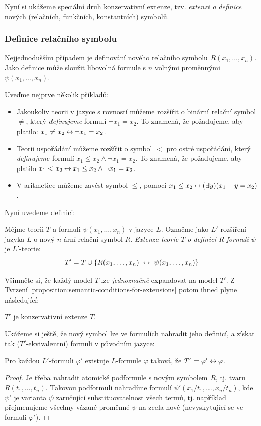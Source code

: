 Nyní si ukážeme speciální druh konzervativní extenze, tzv. \emph{extenzi o definice} nových (relačních, funkčních, konstantních) symbolů.


\subsubsection*{Definice relačního symbolu}

Nejjednodušším případem je definování nového relačního symbolu $R(x_1,\dots,x_n)$. Jako definice může sloužit libovolná formule s $n$ volnými proměnnými $\psi(x_1,\dots,x_n)$.

\begin{example}
Uveďme nejprve několik příkladů:
\begin{itemize}
    \item Jakoukoliv teorii v jazyce s rovností můžeme rozšířit o binární relační symbol $\neq$, který \emph{definujeme} formulí $\neg x_1=x_2$. To znamená, že požadujeme, aby platilo: $x_1\neq x_2\mathbin{\leftrightarrow}\neg x_1=x_2$.
    \item Teorii uspořádání můžeme rozšířit o symbol $<$ pro ostré uspořádání, který \emph{definujeme} formulí $x_1\leq x_2\land \neg x_1=x_2$. To znamená, že požadujeme, aby platilo $x_1<x_2 \mathbin{\leftrightarrow} x_1\leq x_2\land \neg x_1=x_2$.
    \item V aritmetice můžeme zavést symbol $\leq$, pomocí $x_1\leq x_2\mathbin{\leftrightarrow}(\exists y)(x_1+y=x_2)$.
\end{itemize}
\end{example}
Nyní uvedeme definici:
\begin{definition}
    Mějme teorii $T$ a formuli $\psi(x_1,\dots,x_n)$ v jazyce $L$. Označme jako $L'$ rozšíření jazyka $L$ o nový $n$-ární relační symbol $R$. \emph{Extenze teorie $T$ o definici $R$ formulí $\psi$} je $L'$-teorie:
    $$
    T'=T\cup\{R(x_1,\dots,x_n)\ \liff\ \psi(x_1,\dots,x_n)\}
    $$
\end{definition}
Všimněte si, že každý model $T$ lze \emph{jednoznačně} expandovat na model $T'$. Z Tvrzení \ref{proposition:semantic-conditions-for-extensions} potom ihned plyne následující:
\begin{corollary}
    $T'$ je konzervativní extenze $T$.
\end{corollary}

Ukážeme si ještě, že nový symbol lze ve formulích nahradit jeho definicí, a získat tak ($T'$-ekvivalentní) formuli v původním jazyce:

\begin{proposition}
    Pro každou $L'$-formuli $\varphi'$ existuje $L$-formule $\varphi$ taková, že $T'\models\varphi'\mathbin{\leftrightarrow}\varphi$.
\end{proposition}
\begin{proof}
    Je třeba nahradit atomické podformule s novým symbolem $R$, tj. tvaru $R(t_1,\dots,t_n)$. Takovou podformuli nahradíme formulí $\psi'(x_1/t_1,\dots,x_n/t_n)$, kde $\psi'$ je varianta $\psi$ zaručující substituovatelnost všech termů, tj. například přejmenujeme všechny vázané proměnné $\psi$ na zcela nové (nevyskytující se ve formuli $\varphi'$).
\end{proof}

